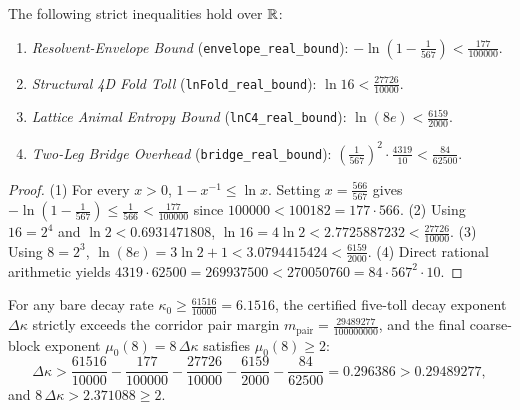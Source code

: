 \begin{theorem}
\label{thm:five_toll_bounds}
The following strict inequalities hold over $\mathbb{R}$:
\begin{enumerate}
    \item \emph{Resolvent-Envelope Bound} (\texttt{envelope\_real\_bound}): $-\ln\!\left(1 - \frac{1}{567}\right) < \frac{177}{100000}$.
    \item \emph{Structural 4D Fold Toll} (\texttt{lnFold\_real\_bound}): $\ln 16 < \frac{27726}{10000}$.
    \item \emph{Lattice Animal Entropy Bound} (\texttt{lnC4\_real\_bound}): $\ln(8e) < \frac{6159}{2000}$.
    \item \emph{Two-Leg Bridge Overhead} (\texttt{bridge\_real\_bound}): $\left(\frac{1}{567}\right)^2 \cdot \frac{4319}{10} < \frac{84}{62500}$.
\end{enumerate}
\end{theorem}

\begin{proof}
(1) For every $x > 0$, $1 - x^{-1} \le \ln x$. Setting $x = \frac{566}{567}$ gives $-\ln(1 - \frac{1}{567}) \le \frac{1}{566} < \frac{177}{100000}$ since $100000 < 100182 = 177 \cdot 566$.
(2) Using $16 = 2^4$ and $\ln 2 < 0.6931471808$, $\ln 16 = 4\ln 2 < 2.7725887232 < \frac{27726}{10000}$.
(3) Using $8 = 2^3$, $\ln(8e) = 3\ln 2 + 1 < 3.0794415424 < \frac{6159}{2000}$.
(4) Direct rational arithmetic yields $4319 \cdot 62500 = 269937500 < 270050760 = 84 \cdot 567^2 \cdot 10$.
\end{proof}

\begin{corollary}
\label{cor:five_toll_surplus}
For any bare decay rate $\kappa_0 \ge \frac{61516}{10000} = 6.1516$, the certified five-toll decay exponent $\Delta\kappa$ strictly exceeds the corridor pair margin $m_{\mathrm{pair}} = \frac{29489277}{100000000}$, and the final coarse-block exponent $\mu_0(8) = 8\,\Delta\kappa$ satisfies $\mu_0(8) \ge 2$:
\begin{equation}
\Delta\kappa > \frac{61516}{10000} - \frac{177}{100000} - \frac{27726}{10000} - \frac{6159}{2000} - \frac{84}{62500} = 0.296386 > 0.29489277,
\end{equation}
and $8\,\Delta\kappa > 2.371088 \ge 2$.
\end{corollary}
